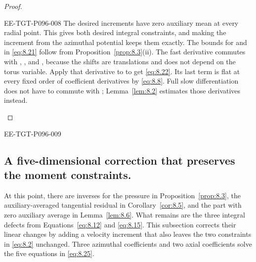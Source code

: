 \begin{proof}
\begin{EESegment}{EE-TGT-P096-008}
The desired increments have zero auxiliary mean at every radial point. This gives both desired
integral constraints, and making the increment from the azimuthal potential keeps them exactly. The
bounds for  and
 in \eqref{eq:8.21} follow from
Proposition~\ref{prop:8.3}(ii). The fast derivative commutes with
, , and
, because the shifts are translations and
 does not depend on the torus variable. Apply that derivative to
 to get \eqref{eq:8.22}. Its last term is flat at
every fixed order of coefficient derivatives by \eqref{eq:8.8}. Full slow differentiation does not
have to commute with ; Lemma~\ref{lem:8.2} estimates those
derivatives instead.
\end{EESegment}
\end{proof}

\begin{EESegment}{EE-TGT-P096-009}
\subsection{A five-dimensional correction that preserves the moment constraints.}\label{sec:8.6}
At this point, there are inverses for the pressure in Proposition~\ref{prop:8.3}, the
auxiliary-averaged tangential residual in Corollary~\ref{cor:8.5}, and the part with zero auxiliary
average in Lemma~\ref{lem:8.6}. What remains are the three integral defects
 from Equations~\eqref{eq:8.12}
and \eqref{eq:8.15}. This subsection corrects their linear changes by adding a velocity increment
that also leaves the two constraints in \eqref{eq:8.2} unchanged. Three azimuthal coefficients and
two axial coefficients solve the five equations in \eqref{eq:8.25}.
\end{EESegment}
